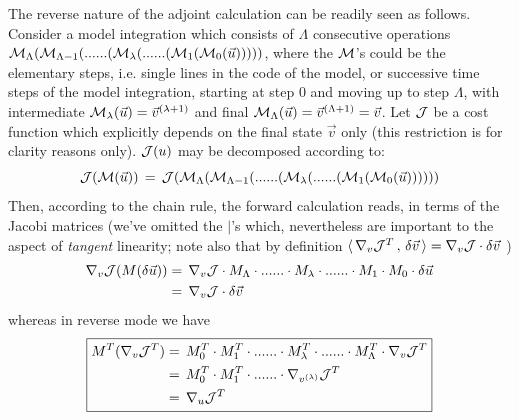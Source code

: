 The {\sf reverse} nature of the adjoint calculation can be readily 
seen as follows. 
Consider a model integration which consists of $ \Lambda $
consecutive operations
$ {\cal M}_{\Lambda} (  {\cal M}_{\Lambda-1} ( 
...... ( {\cal M}_{\lambda} (
......
( {\cal M}_{1} ( {\cal M}_{0}(\vec{u}) )))) $,
where the ${\cal M}$'s could be the elementary steps, i.e. single lines
in the code of the model, or successive time steps of the
model integration, 
starting at step 0 and moving up to step $\Lambda$, with intermediate
${\cal M}_{\lambda} (\vec{u}) = \vec{v}^{(\lambda+1)}$ and final 
${\cal M}_{\Lambda} (\vec{u}) = \vec{v}^{(\Lambda+1)} = \vec{v}$.
Let ${\cal J}$ be a cost function which explicitly depends on the
final state $\vec{v}$ only
(this restriction is for clarity reasons only).
%
${\cal J}(u)$ may be decomposed according to:
%
\begin{equation}
{\cal J}({\cal M}(\vec{u})) \, = \, 
{\cal J} ( {\cal M}_{\Lambda} (  {\cal M}_{\Lambda-1} ( 
...... ( {\cal M}_{\lambda} (
......
( {\cal M}_{1} ( {\cal M}_{0}(\vec{u}) )))))
\label{compos}
\end{equation}
%
Then, according to the chain rule, the forward calculation reads, 
in terms of the Jacobi matrices
(we've omitted the $ | $'s which, nevertheless are important
to the aspect of {\it tangent} linearity;
note also that by definition
$ \langle \, \nabla _{v}{\cal J}^T \, , \, \delta \vec{v} \, \rangle
= \nabla_v {\cal J} \cdot \delta \vec{v} $ )
%
\begin{equation}
\begin{aligned}
\nabla_v {\cal J} (M(\delta \vec{u})) & = \,
\nabla_v {\cal J} \cdot M_{\Lambda}
\cdot ...... \cdot M_{\lambda} \cdot ...... \cdot
M_{1} \cdot M_{0} \cdot \delta \vec{u} \\
~ & = \, \nabla_v {\cal J} \cdot \delta \vec{v} \\
\end{aligned}
\label{forward}
\end{equation}
%
whereas in reverse mode we have
%
\begin{equation}
\boxed{
\begin{aligned}
M^T ( \nabla_v {\cal J}^T) & = \,
M_{0}^T \cdot M_{1}^T
\cdot ...... \cdot M_{\lambda}^T \cdot ...... \cdot 
M_{\Lambda}^T \cdot \nabla_v {\cal J}^T \\
~ & = \, M_{0}^T \cdot M_{1}^T
\cdot ...... \cdot 
\nabla_{v^{(\lambda)}} {\cal J}^T \\
~ & = \, \nabla_u {\cal J}^T
\end{aligned}
}
\label{reverse}
\end{equation}
